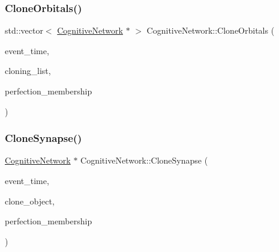 \subsubsection{\texorpdfstring{Clone\+Orbitals()}{CloneOrbitals()}}
{\footnotesize\ttfamily std\+::vector$<$ \mbox{\hyperlink{classCognitiveNetwork}{Cognitive\+Network}} $\ast$ $>$ Cognitive\+Network\+::\+Clone\+Orbitals (\begin{DoxyParamCaption}\item[{std\+::chrono\+::time\+\_\+point$<$ \mbox{\hyperlink{universe_8h_a0ef8d951d1ca5ab3cfaf7ab4c7a6fd80}{Clock}} $>$}]{event\+\_\+time,  }\item[{std\+::vector$<$ \mbox{\hyperlink{classCognitiveNetwork}{Cognitive\+Network}} $\ast$$>$}]{cloning\+\_\+list,  }\item[{double}]{perfection\+\_\+membership }\end{DoxyParamCaption})}

\mbox{\label{classCognitiveNetwork_a40f88d3ce9d386ee4db5c1e0ad84dad2}} 
\subsubsection{\texorpdfstring{Clone\+Synapse()}{CloneSynapse()}}
{\footnotesize\ttfamily \mbox{\hyperlink{classCognitiveNetwork}{Cognitive\+Network}} $\ast$ Cognitive\+Network\+::\+Clone\+Synapse (\begin{DoxyParamCaption}\item[{std\+::chrono\+::time\+\_\+point$<$ \mbox{\hyperlink{universe_8h_a0ef8d951d1ca5ab3cfaf7ab4c7a6fd80}{Clock}} $>$}]{event\+\_\+time,  }\item[{\mbox{\hyperlink{classCognitiveNetwork}{Cognitive\+Network}} $\ast$}]{clone\+\_\+object,  }\item[{double}]{perfection\+\_\+membership }\end{DoxyParamCaption})}

\mbox{\label{classCognitiveNetwork_a82fe792704bcbf7df56b3023266f5f70}} 
